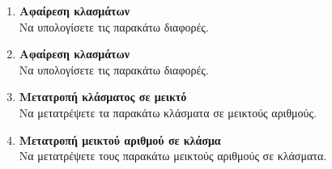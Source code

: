 \documentclass[twoside,nofonts,internet]{askhseis}
\begin{document}
\begin{enumerate}
\begin{multicols}{2}
\end{multicols}
\item \textbf{Αφαίρεση κλασμάτων}\\
Να υπολογίσετε τις παρακάτω διαφορές.
\begin{multicols}{2}
\end{multicols}
\item \textbf{Αφαίρεση κλασμάτων}\\
Να υπολογίσετε τις παρακάτω διαφορές.
\begin{multicols}{2}
\end{multicols}
\item \textbf{Μετατροπή κλάσματος σε μεικτό}\\
Να μετατρέψετε τα παρακάτω κλάσματα σε μεικτούς αριθμούς.
\begin{multicols}{4}
\end{multicols}
\item \textbf{Μετατροπή μεικτού αριθμού σε κλάσμα}\\
Να μετατρέψετε τους παρακάτω μεικτούς αριθμούς σε κλάσματα.

\end{enumerate}
\end{document}
